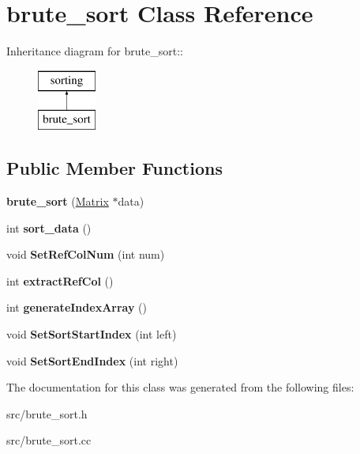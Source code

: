 \hypertarget{classbrute__sort}{
\section{brute\_\-sort Class Reference}
\label{d3/d39/classbrute__sort}
}
Inheritance diagram for brute\_\-sort::\begin{figure}[H]
\begin{center}
\leavevmode
\includegraphics[height=2cm]{d3/d39/classbrute__sort}
\end{center}
\end{figure}
\subsection*{Public Member Functions}
\begin{DoxyCompactItemize}
\item 
\hypertarget{classbrute__sort_a2dbbb3b1c89d6a5720d79a5bf150ad1f}{
{\bfseries brute\_\-sort} (\hyperlink{classMatrix}{Matrix} $\ast$data)}
\label{d3/d39/classbrute__sort_a2dbbb3b1c89d6a5720d79a5bf150ad1f}

\item 
\hypertarget{classbrute__sort_a377b8811e92553a66cdb6780c43e16e6}{
int {\bfseries sort\_\-data} ()}
\label{d3/d39/classbrute__sort_a377b8811e92553a66cdb6780c43e16e6}

\item 
\hypertarget{classbrute__sort_a7d43275af73d67695f2736dcada07b86}{
void {\bfseries SetRefColNum} (int num)}
\label{d3/d39/classbrute__sort_a7d43275af73d67695f2736dcada07b86}

\item 
\hypertarget{classbrute__sort_a548e41cbd5295cef67b18e4d88751ca7}{
int {\bfseries extractRefCol} ()}
\label{d3/d39/classbrute__sort_a548e41cbd5295cef67b18e4d88751ca7}

\item 
\hypertarget{classbrute__sort_ac430d83982bdd362c5e870b56b70eccb}{
int {\bfseries generateIndexArray} ()}
\label{d3/d39/classbrute__sort_ac430d83982bdd362c5e870b56b70eccb}

\item 
\hypertarget{classbrute__sort_a4e18e2ae0ca7c37d657a1447060992ab}{
void {\bfseries SetSortStartIndex} (int left)}
\label{d3/d39/classbrute__sort_a4e18e2ae0ca7c37d657a1447060992ab}

\item 
\hypertarget{classbrute__sort_a7fc765a30ed771ca56ecbc782076b0dc}{
void {\bfseries SetSortEndIndex} (int right)}
\label{d3/d39/classbrute__sort_a7fc765a30ed771ca56ecbc782076b0dc}

\end{DoxyCompactItemize}


The documentation for this class was generated from the following files:\begin{DoxyCompactItemize}
\item 
src/brute\_\-sort.h\item 
src/brute\_\-sort.cc\end{DoxyCompactItemize}
